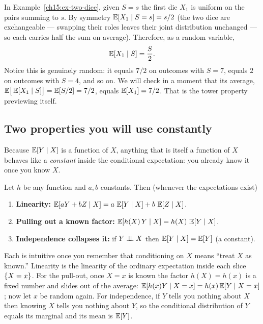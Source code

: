 \begin{example}
In Example~\ref{ch15:ex-two-dice}, given $S = s$ the first die $X_1$ is uniform on the pairs summing to
$s$. By symmetry $\operatorname{\mathbb{E}}[X_1 \mid S = s] = s/2$ (the two dice are exchangeable --- swapping their roles
leaves their joint distribution unchanged --- so each carries half the sum on average). Therefore, as a random variable,
\[
  \operatorname{\mathbb{E}}[X_1 \mid S] = \frac{S}{2}.
\]
Notice this is genuinely random: it equals $7/2$ on outcomes with $S = 7$, equals $2$ on outcomes with
$S = 4$, and so on. We will check in a moment that its average, $\operatorname{\mathbb{E}}\!\big[\operatorname{\mathbb{E}}[X_1\mid S]\big]
= \operatorname{\mathbb{E}}[S/2] = 7/2$, equals $\operatorname{\mathbb{E}}[X_1] = 7/2$. That is the tower property previewing itself.
\end{example}

\subsection{Two properties you will use constantly}
Because $\operatorname{\mathbb{E}}[Y \mid X]$ is a function of $X$, anything that is itself a function of $X$ behaves like a
\emph{constant} inside the conditional expectation: you already know it once you know $X$.

\begin{proposition}
\label{ch15:prop-pullout}
Let $h$ be any function and $a, b$ constants. Then (whenever the expectations exist)
\begin{enumerate}
  \item \textbf{Linearity:} $\operatorname{\mathbb{E}}[aY + bZ \mid X] = a\,\operatorname{\mathbb{E}}[Y\mid X] + b\,\operatorname{\mathbb{E}}[Z \mid X]$.
  \item \textbf{Pulling out a known factor:} $\operatorname{\mathbb{E}}[h(X)\,Y \mid X] = h(X)\,\operatorname{\mathbb{E}}[Y \mid X]$.
  \item \textbf{Independence collapses it:} if $Y \perp\!\!\!\perp X$ then $\operatorname{\mathbb{E}}[Y \mid X] = \operatorname{\mathbb{E}}[Y]$ (a constant).
\end{enumerate}
\end{proposition}

\begin{whybox}
Each is intuitive once you remember that conditioning on $X$ means ``treat $X$ as known.'' Linearity is
the linearity of the ordinary expectation inside each slice $\{X=x\}$. For the pull-out, once
$X = x$ is known the factor $h(X) = h(x)$ is a fixed number and slides out of the average:
$\operatorname{\mathbb{E}}[h(x) Y \mid X = x] = h(x)\operatorname{\mathbb{E}}[Y\mid X = x]$; now let $x$ be random again. For independence, if $Y$
tells you nothing about $X$ then knowing $X$ tells you nothing about $Y$, so the conditional
distribution of $Y$ equals its marginal and its mean is $\operatorname{\mathbb{E}}[Y]$.
\end{whybox}

